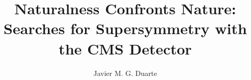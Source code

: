 \documentclass[draftfoot,12pt]{cit_thesis}
\begin{document}
\author{Javier M. G. Duarte}
\title{Naturalness Confronts Nature: Searches for Supersymmetry with the CMS Detector}
\maketitle                  %



\tableofcontents
\mainmatter                                 










{}

\end{document}
